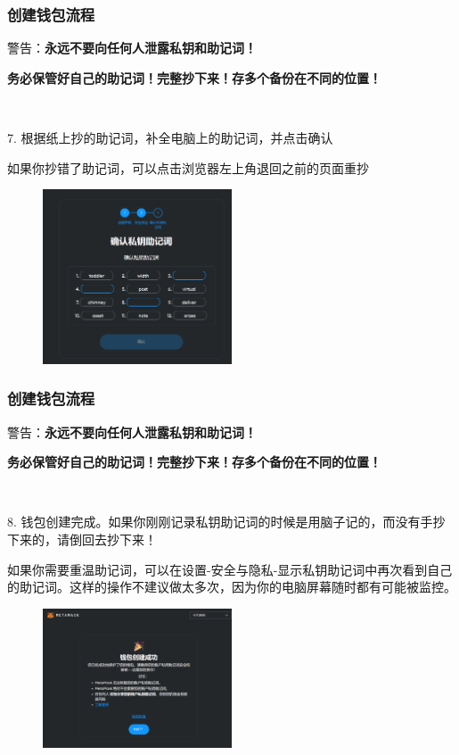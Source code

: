\documentclass{beamer}
\begin{document}
\begin{frame}
    \frametitle{创建钱包流程}

    警告：\textbf{永远不要向任何人泄露私钥和助记词！}

    \textbf{务必保管好自己的助记词！完整抄下来！存多个备份在不同的位置！}

    \

    7. 根据纸上抄的助记词，补全电脑上的助记词，并点击确认

    如果你抄错了助记词，可以点击浏览器左上角退回之前的页面重抄

    \begin{figure}
        \centering
        \includegraphics[width=0.5\textwidth]{m7.png}
    \end{figure}

\end{frame}

\begin{frame}
    \frametitle{创建钱包流程}

    警告：\textbf{永远不要向任何人泄露私钥和助记词！}

    \textbf{务必保管好自己的助记词！完整抄下来！存多个备份在不同的位置！}

    \

    8. 钱包创建完成。如果你刚刚记录私钥助记词的时候是用脑子记的，而没有手抄下来的，请倒回去抄下来！

    如果你需要重温助记词，可以在设置-安全与隐私-显示私钥助记词中再次看到自己的助记词。这样的操作不建议做太多次，因为你的电脑屏幕随时都有可能被监控。

    \begin{figure}
        \centering
        \includegraphics[width=0.5\textwidth]{m8.png}
    \end{figure}

\end{frame}
\end{document}
